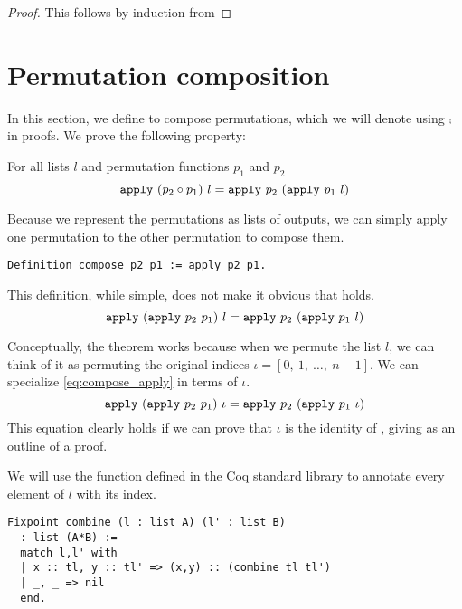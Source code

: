 \documentclass[sigplan,10pt,anonymous,review]{thesis}
\begin{document}
\hdsortsortedS*
\begin{proof}
  This follows by induction from 
\end{proof}

\section{Permutation composition}
\label{appendix:perm_comp}

In this section, we define  to compose permutations,
which we will denote using $\comp$ in proofs. We prove the following
property:

\begin{theorem}
  For all lists $l$ and permutation functions $p_1$ and $p_2$
  \begin{equation*}
    \texttt{\textup{apply}}~(p_2 \circ p_1)~l = \texttt{\textup{apply}}~p_2~(\texttt{\textup{apply}}~p_1~l)
  \end{equation*}
\end{theorem}

Because we represent the permutations as lists of outputs, we can
simply apply one permutation to the other permutation to compose them.
\begin{lstlisting}
Definition compose p2 p1 := apply p2 p1.
\end{lstlisting}
This definition, while simple, does not make it obvious that
 holds.
\begin{equation}
  \label{eq:compose_apply}
  \texttt{\textup{apply}}~(\texttt{\textup{apply}}~p_2~p_1)~l = \texttt{\textup{apply}}~p_2~(\texttt{\textup{apply}}~p_1~l)
\end{equation}

Conceptually, the theorem works because when we permute the list $l$,
we can think of it as permuting the original indices $\iota =
[0,~1,~\ldots,~n-1]$. We can specialize \cref{eq:compose_apply} in terms of
$\iota$.
\begin{equation*}
  \texttt{\textup{apply}}~(\texttt{\textup{apply}}~p_2~p_1)~\iota = \texttt{\textup{apply}}~p_2~(\texttt{\textup{apply}}~p_1~\iota)
\end{equation*}
This equation clearly holds if we can prove that $\iota$ is the identity
of , giving as an outline of a proof.

We will use the function  defined in the Coq standard
library to annotate every element of $l$ with its index.
\begin{lstlisting}
Fixpoint combine (l : list A) (l' : list B)
  : list (A*B) :=
  match l,l' with
  | x :: tl, y :: tl' => (x,y) :: (combine tl tl')
  | _, _ => nil
  end.
\end{lstlisting}
\end{document}

